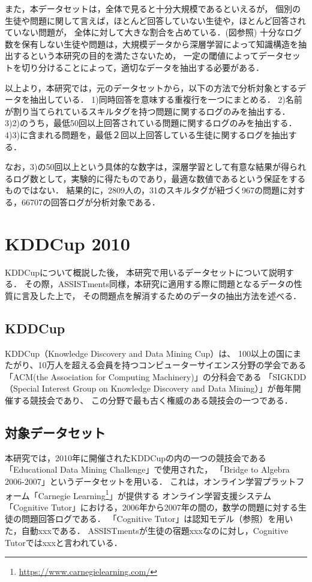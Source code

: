 また，本データセットは，全体で見ると十分大規模であるといえるが，
個別の生徒や問題に関して言えば，ほとんど回答していない生徒や，ほとんど回答されていない問題が，
全体に対して大きな割合を占めている．(図参照)
十分なログ数を保有しない生徒や問題は，大規模データから深層学習によって知識構造を抽出するという本研究の目的を満たさないため，
一定の閾値によってデータセットを切り分けることによって，適切なデータを抽出する必要がある．


以上より，本研究では，元のデータセットから，以下の方法で分析対象とするデータを抽出している．
1)同時回答を意味する重複行を一つにまとめる．
2)名前が割り当てられているスキルタグを持つ問題に関するログのみを抽出する．
3)2)のうち，最低50回以上回答されている問題に関するログのみを抽出する．
4)3)に含まれる問題を，最低２回以上回答している生徒に関するログを抽出する．

なお，3)の50回以上という具体的な数字は，深層学習として有意な結果が得られるログ数として，実験的に得たものであり，最適な数値であるという保証をするものではない．
結果的に，2809人の，31のスキルタグが紐づく967の問題に対する，66707の回答ログが分析対象である．




\section{KDDCup 2010}
KDDCupについて概説した後，
本研究で用いるデータセットについて説明する．
その際，ASSISTments同様，本研究に適用する際に問題となるデータの性質に言及した上で，
その問題点を解消するためのデータの抽出方法を述べる．


\subsection{KDDCup}
KDDCup（Knowledge Discovery and Data Mining Cup）は、
100以上の国にまたがり、10万人を超える会員を持つコンピューターサイエンス分野の学会である「ACM(the Association for Computing Machinery)」の分科会である
「SIGKDD（Special Interest Group on Knowledge Discovery and Data Mining）」が毎年開催する競技会であり、
この分野で最も古く権威のある競技会の一つである．


\subsection{対象データセット}
本研究では，2010年に開催されたKDDCupの内の一つの競技会である「Educational Data Mining Challenge」で使用された，
「Bridge to Algebra 2006-2007」というデータセットを用いる．
これは，オンライン学習プラットフォーム「Carnegie Learning\footnote{\url{https://www.carnegielearning.com/}}」が提供する
オンライン学習支援システム「Cognitive Tutor」における，2006年から2007年の間の，数学の問題に対する生徒の問題回答ログである．
「Cognitive Tutor」は認知モデル（参照）を用いた，自動xxxである．
ASSISTmentsが生徒の宿題xxxなのに対し，Cognitive Tutorではxxxと言われている．

